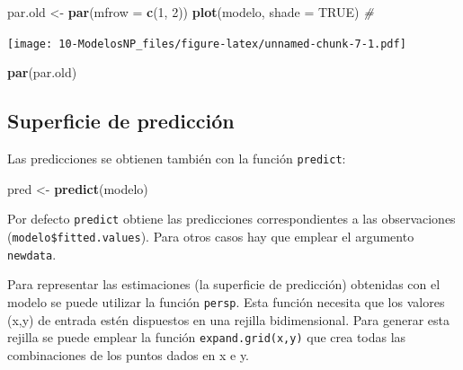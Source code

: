 \documentclass[]{book}
\newenvironment{Shaded}{\begin{snugshade}}{\end{snugshade}}
\newcommand{\KeywordTok}[1]{\textcolor[rgb]{0.13,0.29,0.53}{\textbf{#1}}}
\newcommand{\DataTypeTok}[1]{\textcolor[rgb]{0.13,0.29,0.53}{#1}}
\newcommand{\DecValTok}[1]{\textcolor[rgb]{0.00,0.00,0.81}{#1}}
\newcommand{\StringTok}[1]{\textcolor[rgb]{0.31,0.60,0.02}{#1}}
\newcommand{\CommentTok}[1]{\textcolor[rgb]{0.56,0.35,0.01}{\textit{#1}}}
\newcommand{\OtherTok}[1]{\textcolor[rgb]{0.56,0.35,0.01}{#1}}
\newcommand{\NormalTok}[1]{#1}
\begin{document}
\begin{Shaded}
\begin{Highlighting}[]
\NormalTok{par.old <-}\StringTok{ }\KeywordTok{par}\NormalTok{(}\DataTypeTok{mfrow =} \KeywordTok{c}\NormalTok{(}\DecValTok{1}\NormalTok{, }\DecValTok{2}\NormalTok{))}
\KeywordTok{plot}\NormalTok{(modelo, }\DataTypeTok{shade =} \OtherTok{TRUE}\NormalTok{) }\CommentTok{# }
\end{Highlighting}
\end{Shaded}

\texttt{[image: 10-ModelosNP\_files/figure-latex/unnamed-chunk-7-1.pdf]}

\begin{Shaded}
\begin{Highlighting}[]
\KeywordTok{par}\NormalTok{(par.old)}
\end{Highlighting}
\end{Shaded}

\subsection{Superficie de predicción}\label{superficie-de-prediccion}

Las predicciones se obtienen también con la función \texttt{predict}:

\begin{Shaded}
\begin{Highlighting}[]
\NormalTok{pred <-}\StringTok{ }\KeywordTok{predict}\NormalTok{(modelo)}
\end{Highlighting}
\end{Shaded}

Por defecto \texttt{predict} obtiene las predicciones correspondientes a
las observaciones (\texttt{modelo\$fitted.values}). Para otros casos hay
que emplear el argumento \texttt{newdata}.

Para representar las estimaciones (la superficie de predicción)
obtenidas con el modelo se puede utilizar la función \texttt{persp}.
Esta función necesita que los valores (x,y) de entrada estén dispuestos
en una rejilla bidimensional. Para generar esta rejilla se puede emplear
la función \texttt{expand.grid(x,y)} que crea todas las combinaciones de
los puntos dados en x e y.
\end{document}
